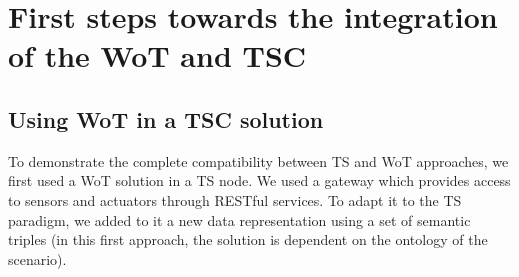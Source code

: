 \section{First steps towards the integration of the WoT and TSC}
\label{sec:integration_wot_tsc}






\subsection{Using WoT in a TSC solution}
\label{sec:wotints}
To demonstrate the complete compatibility between TS and WoT approaches, we first used a WoT solution in a TS node. We used a gateway \cite{guinard_resource_2010} which provides access to sensors and actuators through RESTful services. To adapt it to the TS paradigm, we added to it a new data representation using a set of semantic triples (in this first approach, the solution is dependent on the ontology of the scenario).

